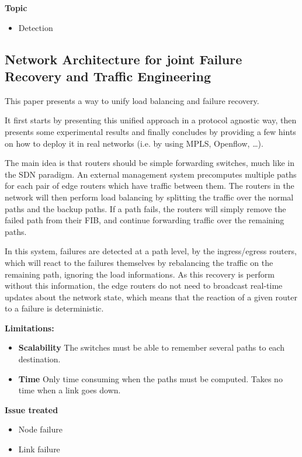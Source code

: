 \documentclass[compsoc]{IEEEtran}
\begin{document}
\textbf{Topic}
\begin{itemize}
	\item Detection
\end{itemize}

\subsection{Network Architecture for joint Failure Recovery and Traffic Engineering \cite{Suchara:2011:NAJ:1993744.1993756}}
This paper presents a way to unify load balancing and failure recovery.

It first starts by presenting this unified approach in a protocol agnostic way, then presents some experimental results and finally concludes by providing a few hints on how to deploy it in real networks (i.e. by using MPLS, Openflow, \ldots).

The main idea is that routers should be simple forwarding switches, much like in the SDN paradigm. An external management system precomputes multiple paths for each pair of edge routers which have traffic between them. The routers in the network will then perform load balancing by splitting the traffic over the normal paths and the backup paths. If a path fails, the routers will simply remove the failed path from their FIB, and continue forwarding traffic over the remaining paths.

In this system, failures are detected at a path level, by the ingress/egress routers, which will react to the failures themselves by rebalancing the traffic on the remaining path, ignoring the load informations. As this recovery is perform without this information, the edge routers do not need to broadcast real-time updates about the network state, which means that the reaction of a given router to a failure is deterministic. 

\textbf{Limitations:}
\begin{itemize}
	\item \textbf{Scalability} The switches must be able to remember several paths to each destination. 
	\item \textbf{Time} Only time consuming when the paths must be computed. Takes no time when a link goes down.
\end{itemize}

\textbf{Issue treated}
\begin{itemize}
	\item Node failure
	\item Link failure
\end{itemize}
\end{document}
